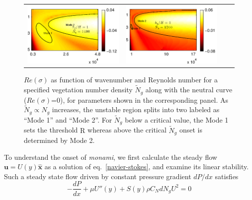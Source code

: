 \documentclass[aps,prl,twocolumn,superscriptaddress,10pt]{revtex4-1}  %
\newcommand{\bu}{\mathbf{u}}
\newcommand{\Rey}{\text{R}}
\newcommand{\Ndg}{\tilde{N}_g}
\newcommand{\monami}{\textit{monami}}
\begin{document}
\begin{figure}
\begin{tabular}{cccc}
{\includegraphics[scale = 0.95]{Set5_dens42_imgsc}} &
{\includegraphics[scale = 0.95]{Set5_dens46_imgsc}} \\
\end{tabular}
\caption{$Re(\sigma)$ as function of wavenumber and Reynolds number for a specified vegetation number density $\Ndg$ along with the neutral curve ($Re(\sigma)$=0), for parameters shown in the corresponding panel.  
As $\Ndg \propto N_g$ increases, the unstable region splits into two labeled as ``Mode 1'' and ``Mode 2''. 
For $\Ndg$ below a critical value, the Mode 1 sets the threshold $\Rey$ whereas above the critical $\Ndg$ onset is determined by Mode 2.}
\label{K_Re_sigma_set3}
\end{figure}
To understand the onset of \monami, we first calculate the steady flow $\bu = U(y)\boldsymbol{\hat{x}}$ as a solution of eq.~\eqref{navier-stokes}, and examine its linear stability. 
Such a steady state flow driven by constant pressure gradient $dP/dx$ satisfies 
\begin{equation}
 -\frac{dP}{dx}+\mu U''(y) +S(y) \rho C_N d N_gU^2=0
\label{base_equ}
\end{equation}
\end{document}

